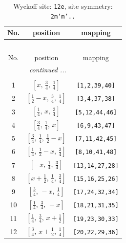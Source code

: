 \documentclass[fleqn,8pt]{jsarticle}
\begin{document}
\begin{longtable}{ccc}
\caption{Wyckoff site: {\tt 12e}, site symmetry: {\tt 2m'm'..}}
 \\
 \hline \hline
No. & position & mapping \\ \hline \endfirsthead

\multicolumn{2}{l}{\tablename\ \thetable{}} \\
 \hline \hline
No. & position & mapping \\ \hline \endhead

 \hline \hline
\multicolumn{2}{r}{\footnotesize\it continued ...} \\ \endfoot

 \hline \hline
\multicolumn{2}{r}{} \\ \endlastfoot

1 & $\left[ x,\, \frac{3}{4},\, \frac{1}{4} \right]$ & {\tt [1,2,39,40]} \\ \hline
2 & $\left[ \frac{1}{2} - x,\, \frac{3}{4},\, \frac{1}{4} \right]$ & {\tt [3,4,37,38]} \\ \hline
3 & $\left[ \frac{1}{4},\, x,\, \frac{3}{4} \right]$ & {\tt [5,12,44,46]} \\ \hline
4 & $\left[ \frac{3}{4},\, \frac{1}{4},\, x \right]$ & {\tt [6,9,43,47]} \\ \hline
5 & $\left[ \frac{3}{4},\, \frac{1}{4},\, \frac{1}{2} - x \right]$ & {\tt [7,11,42,45]} \\ \hline
6 & $\left[ \frac{1}{4},\, \frac{1}{2} - x,\, \frac{3}{4} \right]$ & {\tt [8,10,41,48]} \\ \hline
7 & $\left[ - x,\, \frac{1}{4},\, \frac{3}{4} \right]$ & {\tt [13,14,27,28]} \\ \hline
8 & $\left[ x + \frac{1}{2},\, \frac{1}{4},\, \frac{3}{4} \right]$ & {\tt [15,16,25,26]} \\ \hline
9 & $\left[ \frac{3}{4},\, - x,\, \frac{1}{4} \right]$ & {\tt [17,24,32,34]} \\ \hline
10 & $\left[ \frac{1}{4},\, \frac{3}{4},\, - x \right]$ & {\tt [18,21,31,35]} \\ \hline
11 & $\left[ \frac{1}{4},\, \frac{3}{4},\, x + \frac{1}{2} \right]$ & {\tt [19,23,30,33]} \\ \hline
12 & $\left[ \frac{3}{4},\, x + \frac{1}{2},\, \frac{1}{4} \right]$ & {\tt [20,22,29,36]} \\
\end{longtable}
\renewcommand{\arraystretch}{1.2}
\end{document}
